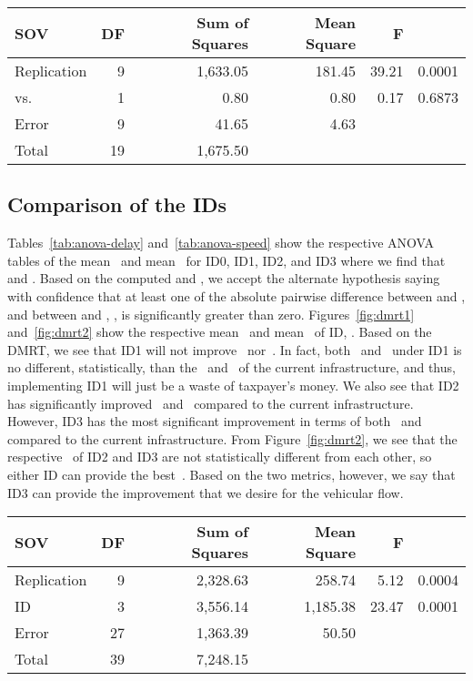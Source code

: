 \documentclass[preprint]{./acm_proc_article-sp}
\begin{document}
\begin{table*}[bth]
\caption{The ANOVA table comparing  and  using the F statistics. SOV means Source of Variation and DF means Degree of Freedom}\label{tab:model-validation}
\centering\begin{tabular}{lrrrrr}
\hline\hline
SOV & DF & Sum of Squares & Mean Square & F & \\
\hline
Replication            & 9  & 1,633.05 & 181.45 & 39.21 &  0.0001 \\
 vs.   & 1  &     0.80 &   0.80 &  0.17 & 0.6873 \\
Error                  & 9  &    41.65 &   4.63 & \\
\hline
Total                  & 19 & 1,675.50 & \\
\hline\hline
\end{tabular}
\end{table*}

\subsection{Comparison of the IDs}

Tables~\ref{tab:anova-delay} and~\ref{tab:anova-speed} show the respective ANOVA tables of the mean~ and mean~ for ID0, ID1, ID2, and ID3 where we find that  and . Based on the computed  and , we accept the alternate hypothesis  saying with confidence  that at least one of the absolute pairwise difference between  and , and between  and , , is significantly greater than zero. Figures~\ref{fig:dmrt1} and~\ref{fig:dmrt2} show the respective mean~ and mean~ of ID, . Based on the DMRT, we see that ID1 will not improve~ nor~. In fact, both~ and~ under ID1 is no different, statistically, than the~ and~ of the current infrastructure, and thus, implementing ID1 will just be a waste of taxpayer's money. We also see that ID2 has significantly improved~ and~ compared to the current infrastructure. However, ID3 has the most significant improvement in terms of both~ and  compared to the current infrastructure. From Figure~\ref{fig:dmrt2}, we see that the respective~ of ID2 and ID3 are not statistically different from each other, so either ID can provide the best~. Based on the two metrics, however, we say that ID3 can provide the improvement that we desire for the vehicular flow.

\begin{table*}[bth]
\caption{The ANOVA table comparing the different IDs in terms of~ using the F statistics. SOV means Source of Variation and DF means Degree of Freedom}\label{tab:anova-delay}
\centering\begin{tabular}{lrrrrr}
\hline\hline
SOV & DF & Sum of Squares & Mean Square & F & \\
\hline
Replication            &  9 & 2,328.63 &   258.74 &  5.12 & 0.0004 \\
ID                     &  3 & 3,556.14 & 1,185.38 & 23.47 &  0.0001 \\
Error                  & 27 & 1,363.39 &    50.50 & \\
\hline
Total                  & 39 & 7,248.15 & \\
\hline\hline
\end{tabular}
\end{table*}
\end{document}
